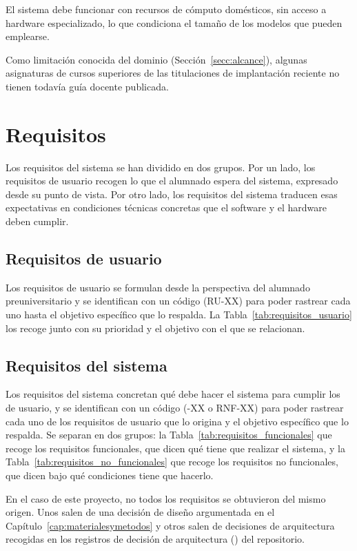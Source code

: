 El sistema debe funcionar con recursos de cómputo
domésticos, sin acceso a hardware especializado, lo que condiciona el tamaño de
los modelos que pueden emplearse.

Como limitación conocida del dominio (Sección~\ref{secc:alcance}), algunas asignaturas de cursos superiores
de las titulaciones de implantación reciente no tienen todavía guía docente
publicada.


\section{Requisitos}

Los requisitos del sistema se han dividido en dos grupos. Por un lado, los requisitos de usuario recogen lo que el alumnado espera del sistema, expresado desde su punto de vista. Por otro lado, los requisitos del sistema traducen esas expectativas en condiciones técnicas concretas que el software y el hardware deben cumplir.

\subsection{Requisitos de usuario}

Los requisitos de usuario se formulan desde la perspectiva del alumnado preuniversitario y se identifican con un código (RU-XX) para poder rastrear cada uno hasta el objetivo específico que lo respalda. La Tabla~\ref{tab:requisitos_usuario} los recoge junto con su prioridad  y el objetivo con el que se relacionan.




\subsection{Requisitos del sistema}

Los requisitos del sistema concretan qué debe hacer el sistema para cumplir los de usuario, y se identifican con un código (-XX o RNF-XX) para poder rastrear cada uno de los requisitos de usuario que lo origina y el objetivo específico que lo respalda. Se separan en dos grupos: la Tabla~\ref{tab:requisitos_funcionales} que recoge los requisitos funcionales, que dicen qué tiene que realizar el sistema, y la Tabla~\ref{tab:requisitos_no_funcionales} que recoge los requisitos no funcionales, que dicen bajo qué condiciones tiene que hacerlo.

En el caso de este proyecto, no todos los requisitos se obtuvieron del mismo origen. Unos salen de una decisión de diseño argumentada en el Capítulo~\ref{cap:materialesymetodos} y otros salen de decisiones de arquitectura recogidas en los registros de decisión de arquitectura () del repositorio.


